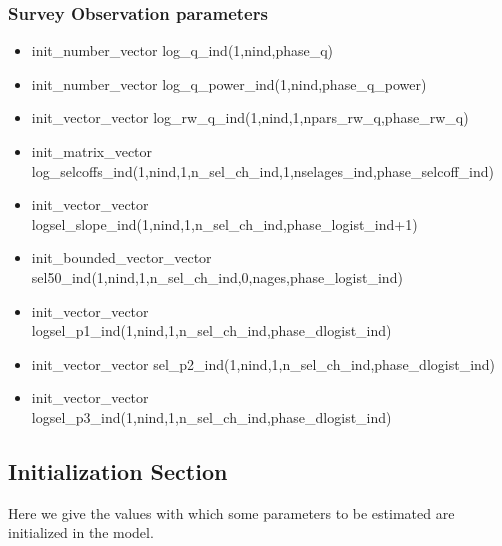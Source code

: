 \documentclass{article}
\begin{document}
\subsubsection{Survey Observation parameters}
\begin{itemize}
    \item init\_number\_vector log\_q\_ind(1,nind,phase\_q) 
    \item init\_number\_vector log\_q\_power\_ind(1,nind,phase\_q\_power)
    \item init\_vector\_vector log\_rw\_q\_ind(1,nind,1,npars\_rw\_q,phase\_rw\_q) 
    \item init\_matrix\_vector log\_selcoffs\_ind(1,nind,1,n\_sel\_ch\_ind,1,nselages\_ind,phase\_selcoff\_ind)
    \item init\_vector\_vector logsel\_slope\_ind(1,nind,1,n\_sel\_ch\_ind,phase\_logist\_ind+1)
    \item init\_bounded\_vector\_vector        sel50\_ind(1,nind,1,n\_sel\_ch\_ind,0,nages,phase\_logist\_ind)
    \item init\_vector\_vector logsel\_p1\_ind(1,nind,1,n\_sel\_ch\_ind,phase\_dlogist\_ind)
    \item init\_vector\_vector    sel\_p2\_ind(1,nind,1,n\_sel\_ch\_ind,phase\_dlogist\_ind)
    \item init\_vector\_vector logsel\_p3\_ind(1,nind,1,n\_sel\_ch\_ind,phase\_dlogist\_ind)
\end{itemize}
\subsection{Initialization Section}
Here we give the values with which some parameters to be estimated are initialized in the model.
\end{document}
